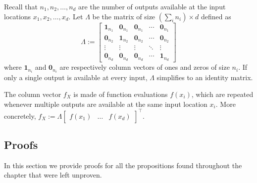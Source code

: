 Recall that $n_1, n_2, \dots, n_d$ are the number of outputs available at the input locations $x_1,x_2,\dots,x_d$. Let $\Lambda$ be the matrix of size $(\sum_i n_i) \times d$ defined as
\begin{equation}
	\Lambda :=
	\begin{bmatrix}
		\bm{1}_{n_1} & \bm{0}_{n_1} & \bm{0}_{n_1} & \cdots & \bm{0}_{n_1} \\
		\bm{0}_{n_2} & \bm{1}_{n_2} & \bm{0}_{n_2} & \cdots & \bm{0}_{n_2} \\
		\vdots & \vdots & \vdots & \ddots & \vdots \\ 
		\bm{0}_{n_d} & \bm{0}_{n_d} & \bm{0}_{n_d} & \cdots & \bm{1}_{n_d} 
	\end{bmatrix}
\end{equation}
where $\bm{1}_{n_i}$ and $\bm{0}_{n_i}$ are respectively column vectors of ones and zeros of size $n_i$. If only a single output is available at every input, $\Lambda$ simplifies to an identity matrix.

The column vector $f_X$ is made of function evaluations $f(x_i)$, which are repeated whenever multiple outputs are available at the same input location $x_i$. More concretely, $f_X := \Lambda \begin{bmatrix} f(x_1) & \dots & f(x_d) \end{bmatrix}^\top$.

\subsection{Proofs}
\label{sec.selected_derivations}

In this section we provide proofs for all the propositions found throughout the chapter that were left unproven.


